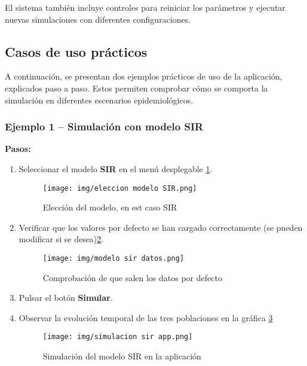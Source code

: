 El sistema también incluye controles para reiniciar los parámetros y ejecutar nuevas simulaciones con diferentes configuraciones.

\subsection{Casos de uso prácticos}

A continuación, se presentan dos ejemplos prácticos de uso de la aplicación, explicados paso a paso. Estos permiten comprobar cómo se comporta la simulación en diferentes escenarios epidemiológicos.

\vspace{1em}
\subsubsection{Ejemplo 1 – Simulación con modelo SIR}

\textbf{Pasos:}
\begin{enumerate}
    \item Seleccionar el modelo \textbf{SIR} en el menú desplegable \ref{fig:eleccion sir}.
    \begin{figure}[H]
        \centering
        \texttt{[image: img/eleccion modelo SIR.png]}
        \caption{Elección del modelo, en est caso SIR}
        \label{fig:eleccion sir}
        \vspace{0.5cm} %
    \end{figure}
    
     \item Verificar que los valores por defecto se han cargado correctamente (se pueden modificar si se desea)\ref{fig:datos defecto}.

\begin{figure}[H]
        \centering
        \texttt{[image: img/modelo sir datos.png]}
        \caption{Comprobación de que salen los datos por defecto}
        \label{fig:datos defecto}
        \vspace{0.5cm} %
    \end{figure}
     
      \item Pulsar el botón \textbf{Simular}.

     
    \item Observar la evolución temporal de las tres poblaciones en la gráfica \ref{fig:simulacion sir ap}
    
   

    
   
   
    \begin{figure}[H]
        \centering
        \texttt{[image: img/simulacion sir app.png]}
        \caption{Simulación del modelo SIR en la aplicación}
        \label{fig:simulacion sir ap}
        \vspace{0.5cm} %
    \end{figure}
\end{enumerate}


